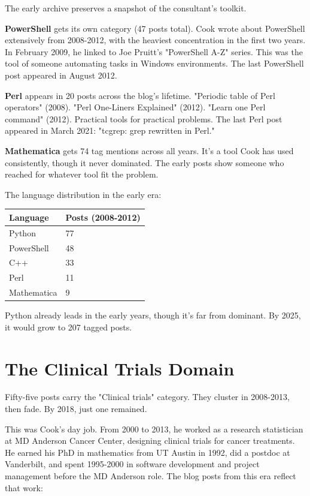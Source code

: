 The early archive preserves a snapshot of the consultant's toolkit.

\textbf{PowerShell} gets its own category (47 posts total). Cook wrote about PowerShell extensively from 2008-2012, with the heaviest concentration in the first two years. In February 2009, he linked to Joe Pruitt's "PowerShell A-Z" series. This was the tool of someone automating tasks in Windows environments. The last PowerShell post appeared in August 2012.

\textbf{Perl} appears in 20 posts across the blog's lifetime. "Periodic table of Perl operators" (2008). "Perl One-Liners Explained" (2012). "Learn one Perl command" (2012). Practical tools for practical problems. The last Perl post appeared in March 2021: "tcgrep: grep rewritten in Perl."

\textbf{Mathematica} gets 74 tag mentions across all years. It's a tool Cook has used consistently, though it never dominated. The early posts show someone who reached for whatever tool fit the problem.

The language distribution in the early era:

\begin{longtable}{l p{6.5cm}}
\toprule
\textbf{Language} & \textbf{Posts (2008-2012)} \tabularnewline
\midrule
Python & 77 \tabularnewline
PowerShell & 48 \tabularnewline
C++ & 33 \tabularnewline
Perl & 11 \tabularnewline
Mathematica & 9 \tabularnewline
\bottomrule
\end{longtable}

Python already leads in the early years, though it's far from dominant. By 2025, it would grow to 207 tagged posts.

\bigskip

\section*{The Clinical Trials Domain}

Fifty-five posts carry the "Clinical trials" category. They cluster in 2008-2013, then fade. By 2018, just one remained.

This was Cook's day job. From 2000 to 2013, he worked as a research statistician at MD Anderson Cancer Center, designing clinical trials for cancer treatments. He earned his PhD in mathematics from UT Austin in 1992, did a postdoc at Vanderbilt, and spent 1995-2000 in software development and project management before the MD Anderson role. The blog posts from this era reflect that work:

